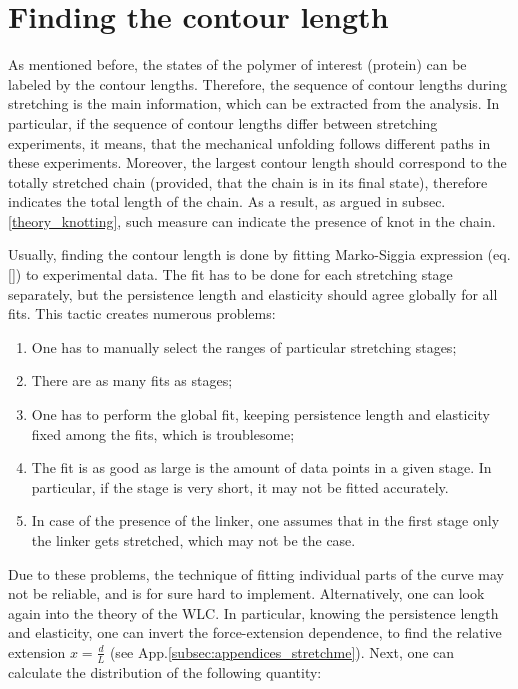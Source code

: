 \section{Finding the contour length}
\label{sec:theory_cl}
As mentioned before, the states of the polymer of interest (protein) can be labeled by the contour lengths.
Therefore, the sequence of contour lengths during stretching is the main information, which can be extracted from the analysis.
In particular, if the sequence of contour lengths differ between stretching experiments, it means, that the mechanical unfolding follows different paths in these experiments.
Moreover, the largest contour length should correspond to the totally stretched chain (provided, that the chain is in its final state), therefore indicates the total length of the chain.
As a result, as argued in subsec.\ref{theory_knotting}, such measure can indicate the presence of knot in the chain.

Usually, finding the contour length is done by fitting Marko-Siggia expression (eq.\ref{}) to experimental data.
The fit has to be done for each stretching stage separately, but the persistence length and elasticity should agree globally for all fits.
This tactic creates numerous problems:
\begin{enumerate}
    \item One has to manually select the ranges of particular stretching stages;
    \item There are as many fits as stages;
    \item One has to perform the global fit, keeping persistence length and elasticity fixed among the fits, which is troublesome;
    \item The fit is as good as large is the amount of data points in a given stage. In particular, if the stage is very short, it may not be fitted accurately.
    \item In case of the presence of the linker, one assumes that in the first stage only the linker gets stretched, which may not be the case.
\end{enumerate}

Due to these problems, the technique of fitting individual parts of the curve may not be reliable, and is for sure hard to implement.
Alternatively, one can look again into the theory of the WLC.
In particular, knowing the persistence length and elasticity, one can invert the force-extension dependence, to find the relative extension $x=\frac{d}{L}$ (see App.\ref{subsec:appendices_stretchme}). Next, one can calculate the distribution of the following quantity:

